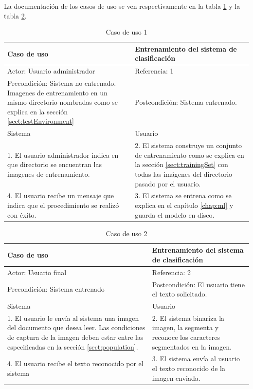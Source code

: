 \documentclass[a4paper, 11pt, oneside]{report}
\begin{document}
La documentación de los casos de uso se ven respectivamente en la tabla \ref{tb:uc1} y la tabla \ref{tb:uc2}.

\begin{table}
\begin{center}
\begin{tabular}{|p{5cm}|p{5cm}|}
	\hline
	Caso de uso & Entrenamiento del sistema de clasificación\\
	\hline
	Actor: Usuario administrador & Referencia: 1 \\
	\hline
	Precondición: Sistema no entrenado. Imagenes de entrenamiento en un mismo directorio nombradas como se explica en la sección \ref{sect:testEnvironment} & 
	Postcondición: Sistema entrenado. \\
	\hline
	Sistema & Usuario \\
	\hline
	1. El usuario administrador indica en que directorio se encuentran las imagenes de entrenamiento. &
	2. El sistema construye un conjunto de entrenamiento como se explica en la sección \ref{sect:trainingSet} con todas las imágenes del directorio pasado por el usuario. \\
	\hline
	4. El usuario recibe un mensaje que indica que el procedimiento se realizó con éxito. &
	3. El sistema se entrena como se explica en el capítulo \ref{chap:ml} y guarda el modelo en disco. \\
	\hline
\end{tabular}
\end{center}
\caption{Caso de uso 1}	
\label{tb:uc1}
\end{table}

\begin{table}
\begin{center}
\begin{tabular}{|p{5cm}|p{5cm}|}
	\hline
	Caso de uso & Entrenamiento del sistema de clasificación\\
	\hline
	Actor: Usuario final & Referencia: 2 \\
	\hline
	Precondición: Sistema entrenado & Postcondición: El usuario tiene el texto solicitado. \\
	\hline
	Sistema & Usuario \\
	\hline
	1. El usuario le envía al sistema una imagen del documento que desea leer. Las condiciones de captura de la imagen deben estar entre las especificadas en la sección \ref{sect:population}. &
	2. El sistema binariza la imagen, la segmenta y reconoce los caracteres segmentados en la imagen. \\
	\hline
	4. El usuario recibe el texto reconocido por el sistema &
	3. El sistema envía al usuario el texto reconocido de la imagen enviada. \\
	\hline
\end{tabular}
\end{center}
\caption{Caso de uso 2}	
\label{tb:uc2}
\end{table}
\end{document}
